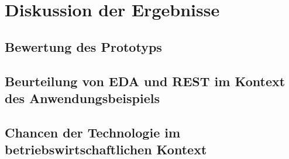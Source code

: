 \section{Diskussion der Ergebnisse}
\subsection{Bewertung des Prototyps}

\subsection{Beurteilung von EDA und REST im Kontext des Anwendungsbeispiels}
\subsection{Chancen der Technologie im betriebswirtschaftlichen Kontext}
